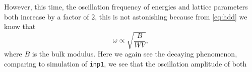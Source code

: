 However, this time, the oscillation frequency of energies and lattice parameters
both increase by a factor of $2$, this is not astonishing because from
\eqref{eq:hdd} we know that
\begin{equation}
	\omega \propto \sqrt{
		\frac{ B }{ W V }
	},
\end{equation}
where $B$ is the bulk modulus.
Here we again see the decaying phenomenon,
comparing to simulation of \texttt{inp1}, we see that the oscillation amplitude of
both
